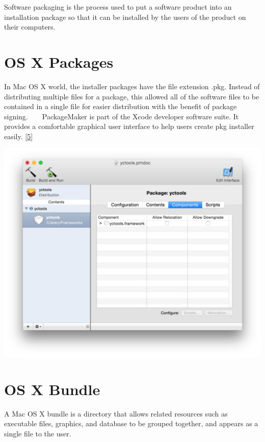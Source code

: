 Software packaging is the process used to put a software product into an installation package so that it can be installed by the users of the product on their computers. \hypertarget{_software_packaging_SoftwarePackagingOSXPackages}{}\section{O\+S X Packages}\label{_software_packaging_SoftwarePackagingOSXPackages}
In Mac O\+S X world, the installer packages have the file extension .pkg. Instead of distributing multiple files for a package, this allowed all of the software files to be contained in a single file for easier distribution with the benefit of package signing. ~\newline
~\newline
Package\+Maker is part of the Xcode developer software suite. It provides a comfortable graphical user interface to help users create pkg installer easily. \mbox{[}\hyperlink{_reference_r5}{5}\mbox{]} 
\begin{DoxyImageNoCaption}
  \mbox{\includegraphics[width=\textwidth,height=\textheight/2,keepaspectratio=true]{ResearchPackegeMaker.png}}
\end{DoxyImageNoCaption}
\hypertarget{_software_packaging_SoftwarePackagingOSXBundle}{}\section{O\+S X Bundle}\label{_software_packaging_SoftwarePackagingOSXBundle}
A Mac O\+S X bundle is a directory that allows related resources such as executable files, graphics, and database to be grouped together, and appears as a single file to the user.
